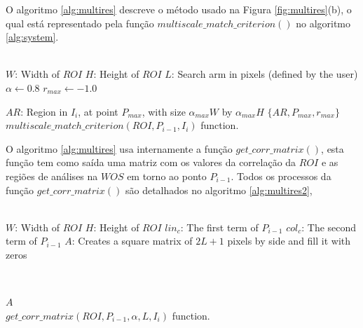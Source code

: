 O algoritmo \ref{alg:multires} descreve o método usado na Figura \ref{fig:multires}(b), o qual
está representado pela função $multiscale\_match\_criterion()$ no algoritmo \ref{alg:system}.
\begin{algorithm}
 ~\\
 $W$: Width of $ROI$\;
 $H$: Height of $ROI$\;
 $L$: Search arm in pixels (defined by the user)\;
 $\alpha \leftarrow 0.8$\;
 $r_{max} \leftarrow -1.0$\;
 ~\\
    
$AR$: Region in $I_i$, at point $P_{max}$, with size $\alpha_{max} W$ by $\alpha_{max} H$\;      
\Return $\{AR,P_{max},r_{max}\}$\;
~\\
\caption{$multiscale\_match\_criterion(ROI,P_{i-1},I_i)$ function.}
\label{alg:multires}
\end{algorithm}
O algoritmo \ref{alg:multires} usa internamente a função $get\_corr\_matrix()$,
esta função tem como saída uma matriz com os valores da correlação da $ROI$ e as regiões de análises na $WOS$
em torno ao ponto $P_{i-1}$. Todos os processos da função $get\_corr\_matrix()$ são detalhados no algoritmo
\ref{alg:multires2},
\begin{algorithm}
 ~\\
 $W$: Width of $ROI$\;
 $H$: Height of $ROI$\;
 $lin_c$: The first term of $P_{i-1}$\;
 $col_c$: The second term of $P_{i-1}$\;
 $A$: Creates a square matrix of $2L+1$ pixels by side and fill it with zeros\;

 ~\\
    
\Return $A$\;
~\\
\caption{$get\_corr\_matrix(ROI,P_{i-1},\alpha,L,I_i)$ function.}
\label{alg:multires2}
\end{algorithm}
